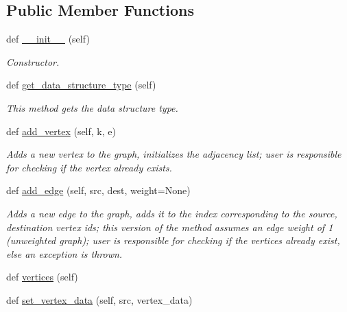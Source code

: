 \subsection*{Public Member Functions}
\begin{DoxyCompactItemize}
\item 
def \hyperlink{classbridges_1_1graph__adj__matrix_1_1_graph_adj_matrix_a77b2efa6f296054ada425ee61e0d22a8}{\+\_\+\+\_\+init\+\_\+\+\_\+} (self)
\begin{DoxyCompactList}\small\item\em Constructor. \end{DoxyCompactList}\item 
def \hyperlink{classbridges_1_1graph__adj__matrix_1_1_graph_adj_matrix_a54eb655222dcff0a569728b150e493b7}{get\+\_\+data\+\_\+structure\+\_\+type} (self)
\begin{DoxyCompactList}\small\item\em This method gets the data structure type. \end{DoxyCompactList}\item 
def \hyperlink{classbridges_1_1graph__adj__matrix_1_1_graph_adj_matrix_aa6fa31ebae643950dd33628269136d00}{add\+\_\+vertex} (self, k, e)
\begin{DoxyCompactList}\small\item\em Adds a new vertex to the graph, initializes the adjacency list; user is responsible for checking if the vertex already exists. \end{DoxyCompactList}\item 
def \hyperlink{classbridges_1_1graph__adj__matrix_1_1_graph_adj_matrix_aad67dc7b3da58ff67fd807a3455765c1}{add\+\_\+edge} (self, src, dest, weight=None)
\begin{DoxyCompactList}\small\item\em Adds a new edge to the graph, adds it to the index corresponding to the source, destination vertex ids; this version of the method assumes an edge weight of 1 (unweighted graph); user is responsible for checking if the vertices already exist, else an exception is thrown. \end{DoxyCompactList}\item 
def \hyperlink{classbridges_1_1graph__adj__matrix_1_1_graph_adj_matrix_a2f7f0fe4ba172afeb1dcb1afc1f6bf31}{vertices} (self)
\item 
def \hyperlink{classbridges_1_1graph__adj__matrix_1_1_graph_adj_matrix_a96d735f98243acee1a604ed9dc990356}{set\+\_\+vertex\+\_\+data} (self, src, vertex\+\_\+data)
\item 

\end{DoxyCompactItemize}
